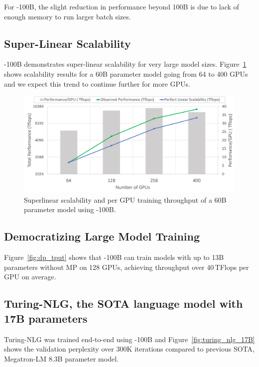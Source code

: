 For \name-100B, the slight reduction in performance beyond 100B is due to lack of enough memory to run larger batch sizes.

\subsection{Super-Linear Scalability}
\name-100B demonstrates super-linear scalability for very large model sizes. Figure~\ref{fig:hyperscale_60B} shows scalability results for a 60B parameter model going from 64 to 400 GPUs and we expect this trend to continue further for more GPUs.

\begin{figure}[t!]
   \begin{center}
   \includegraphics[width=1.0\columnwidth]{hyperscale_60B_model_v2.PNG}
   \caption{Superlinear scalability and per GPU training throughput of a 60B parameter model using \name-100B.} 
   \label{fig:hyperscale_60B}
   \end{center}
\end{figure}

\subsection{Democratizing Large Model Training}
Figure~\ref{fig:dp_tput} shows that \name-100B can train models with up to 13B parameters without MP on 128 GPUs, achieving throughput over 40\,TFlops per GPU on average.

\subsection{Turing-NLG, the SOTA language model with 17B parameters}
Turing-NLG was trained end-to-end using \name-100B and Figure~\ref{fig:turing_nlg_17B} shows the validation perplexity over 300K iterations compared to previous SOTA, Megatron-LM 8.3B parameter model.

